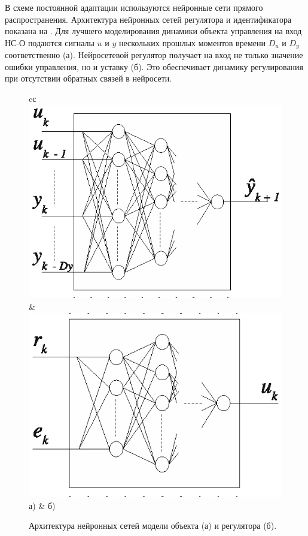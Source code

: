 В схеме постоянной адаптации используются нейронные сети прямого
распространения.  Архитектура нейронных сетей регулятора и
идентификатора показана на .  Для лучшего
моделирования динамики объекта управления на вход НС-О подаются
сигналы $u$ и $y$ нескольких прошлых моментов времени $D_u$ и $D_y$
соответственно (а).  Нейросетевой
регулятор получает на вход не только значение ошибки управления, но и
уставку (б).  Это обеспечивает динамику
регулирования при отсутствии обратных связей в нейросети.

\begin{figure}[h]
\centering
\begin{tabular}{cс}
\includegraphics{nonst_nnp_schema} & \includegraphics{nonst_nnc_schema} \\
а) & б)\\
\end{tabular}
\caption{Архитектура нейронных сетей модели объекта (а) и регулятора (б).}
\label{fig:nonst_nn_schema}
\end{figure}

